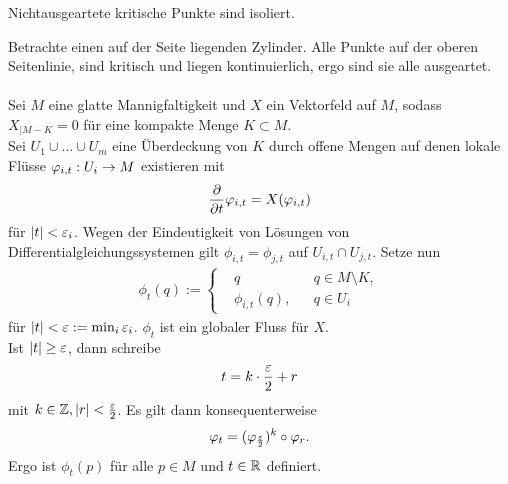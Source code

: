 \Kor{}
Nichtausgeartete kritische Punkte sind isoliert.

\Bsp{}
Betrachte einen auf der Seite liegenden Zylinder. Alle Punkte auf der oberen Seitenlinie, sind kritisch und liegen kontinuierlich, ergo sind sie alle ausgeartet.\\\\


Sei $M$ eine glatte Mannigfaltigkeit und $X$ ein Vektorfeld auf $M$, sodass $X_{|M-K} = 0$ für eine kompakte Menge $K \subset M$.\\
Sei $U_1\cup \ldots \cup U_m$ eine Überdeckung von $K$ durch offene Mengen auf denen lokale Flüsse $\varphi_{i,t} : U_i \overset{}{\rightarrow} M$ existieren mit
\[ \frac{\partial }{\partial t} \varphi_{i,t} = X(\varphi_{i,t}) \]
für $\left|t\right|<\varepsilon_i$. Wegen der Eindeutigkeit von Lösungen von Differentialgleichungssystemen gilt $\phi_{i,t} = \phi_{j,t}$ auf $U_{i,t} \cap U_{j,t}$. Setze nun
\begin{align*}
\phi_t(q):=
\left\lbrace
\begin{aligned}
&q && q \in M \setminus K,\\
& \phi_{i,t}(q), && q \in U_i
\end{aligned}
\right.
\end{align*}
für $\left|t\right|< \varepsilon := \min_i \varepsilon_i$.
$\phi_t$ ist ein globaler Fluss für $X$.\\
Ist $\left|t\right| \geq \varepsilon$, dann schreibe
\[ t = k \cdot \frac{\varepsilon}{2} + r \]
mit $k \in \mathbb{Z}, \left|r\right| < \frac{\varepsilon}{2}$. Es gilt dann konsequenterweise
\[ \varphi_t = (\varphi_{\frac{\varepsilon}{2}})^k \circ \varphi_r. \]
Ergo ist $\phi_t(p)$ für alle $p \in M$ und $t\in \mathbb{R}$ definiert.

